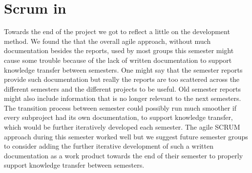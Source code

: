 
\section{Scrum in \giraf}

Towards the end of the project we got to reflect a little on the \giraf development method. We found the that the overall agile approach, without much documentation besides the reports, used by most groups this semester might cause some trouble because of the lack of written documentation to support knowledge transfer between semesters. One might say that the semester reports provide such documentation but really the reports are too scattered across the different semesters and the different projects to be useful. Old semester reports might also include information that is no longer relevant to the next semesters. The transition process between semester could possibly run much smoother if every subproject had its own documentation, to support knowledge transfer, which would be further iteratively developed each semester. The agile SCRUM approach during this semester worked well but we suggest future semester groups to consider adding the further iterative development of such a written documentation as a work product towards the end of their semester to properly support knowledge transfer between semesters.